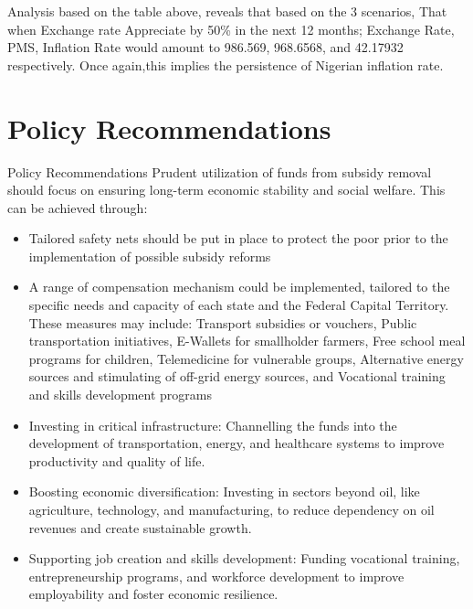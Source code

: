 \documentclass{beamer}
\begin{document}
{\begin{frame}
\begin{table}[ht]
\end{table}
Analysis based on the table above, reveals that based on the 3 scenarios, That when Exchange rate Appreciate by 50\% in the next 12 months; Exchange Rate, PMS, Inflation Rate would amount to 986.569, 968.6568, and 42.17932 respectively. Once again,this implies the persistence of Nigerian inflation rate.
\end{frame}
\section{Policy Recommendations}

\begin{frame}{Policy Recommendations}
    Prudent utilization of funds from subsidy removal should focus on ensuring long-term economic stability and social welfare. This can be achieved through:
    \begin{itemize}
    \item Tailored safety nets should be put in place to protect the poor prior to the implementation of possible subsidy reforms
    \item A range of compensation mechanism could be implemented, tailored to the specific needs and capacity of each state and the Federal Capital Territory. These measures may include: Transport subsidies or vouchers, Public transportation initiatives, E-Wallets for smallholder farmers, Free school meal programs for children, Telemedicine for vulnerable groups, Alternative energy sources and stimulating of off-grid energy sources, and Vocational training and skills development programs
    \end{itemize}
\end{frame}
\begin{frame}
\begin{itemize}
\item Investing in critical infrastructure: Channelling the funds into the development of transportation, energy, and healthcare systems to improve productivity and quality of life.


\item Boosting economic diversification: Investing in sectors beyond oil, like agriculture, technology, and manufacturing, to reduce dependency on oil revenues and create sustainable growth.

\item Supporting job creation and skills development: Funding vocational training, entrepreneurship programs, and workforce development to improve employability and foster economic resilience.


\end{itemize}
\end{frame}}
\end{document}
